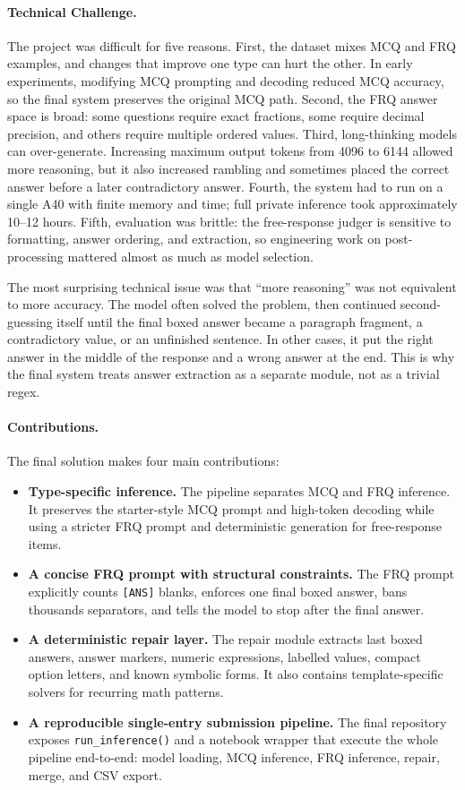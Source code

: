 \documentclass{article}
\begin{document}
\paragraph{Technical Challenge.}
The project was difficult for five reasons. First, the dataset mixes MCQ and FRQ examples, and changes that improve one type can hurt the other. In early experiments, modifying MCQ prompting and decoding reduced MCQ accuracy, so the final system preserves the original MCQ path. Second, the FRQ answer space is broad: some questions require exact fractions, some require decimal precision, and others require multiple ordered values. Third, long-thinking models can over-generate. Increasing maximum output tokens from 4096 to 6144 allowed more reasoning, but it also increased rambling and sometimes placed the correct answer before a later contradictory answer. Fourth, the system had to run on a single A40 with finite memory and time; full private inference took approximately 10--12 hours. Fifth, evaluation was brittle: the free-response judger is sensitive to formatting, answer ordering, and extraction, so engineering work on post-processing mattered almost as much as model selection.

The most surprising technical issue was that ``more reasoning'' was not equivalent to more accuracy. The model often solved the problem, then continued second-guessing itself until the final boxed answer became a paragraph fragment, a contradictory value, or an unfinished sentence. In other cases, it put the right answer in the middle of the response and a wrong answer at the end. This is why the final system treats answer extraction as a separate module, not as a trivial regex.

\paragraph{Contributions.}
The final solution makes four main contributions:
\begin{itemize}
    \item \textbf{Type-specific inference.} The pipeline separates MCQ and FRQ inference. It preserves the starter-style MCQ prompt and high-token decoding while using a stricter FRQ prompt and deterministic generation for free-response items.
    \item \textbf{A concise FRQ prompt with structural constraints.} The FRQ prompt explicitly counts \texttt{[ANS]} blanks, enforces one final boxed answer, bans thousands separators, and tells the model to stop after the final answer.
    \item \textbf{A deterministic repair layer.} The repair module extracts last boxed answers, answer markers, numeric expressions, labelled values, compact option letters, and known symbolic forms. It also contains template-specific solvers for recurring math patterns.
    \item \textbf{A reproducible single-entry submission pipeline.} The final repository exposes \texttt{run\_inference()} and a notebook wrapper that execute the whole pipeline end-to-end: model loading, MCQ inference, FRQ inference, repair, merge, and CSV export.
\end{itemize}
\end{document}
